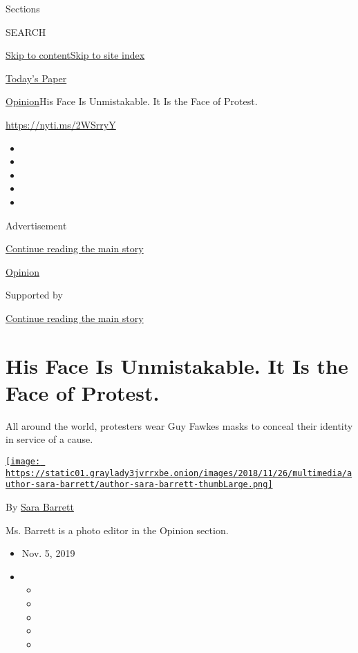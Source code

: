 Sections

SEARCH

\protect\hyperlink{site-content}{Skip to
content}\protect\hyperlink{site-index}{Skip to site index}

\href{https://myaccount.nytimes3xbfgragh.onion/auth/login?response_type=cookie\&client_id=vi}{}

\href{https://www.nytimes3xbfgragh.onion/section/todayspaper}{Today's
Paper}

\href{/section/opinion}{Opinion}\textbar{}His Face Is Unmistakable. It
Is the Face of Protest.

\url{https://nyti.ms/2WSrryY}

\begin{itemize}
\item
\item
\item
\item
\item
\end{itemize}

Advertisement

\protect\hyperlink{after-top}{Continue reading the main story}

\href{/section/opinion}{Opinion}

Supported by

\protect\hyperlink{after-sponsor}{Continue reading the main story}

\hypertarget{his-face-is-unmistakable-it-is-the-face-of-protest}{%
\section{His Face Is Unmistakable. It Is the Face of
Protest.}\label{his-face-is-unmistakable-it-is-the-face-of-protest}}

All around the world, protesters wear Guy Fawkes masks to conceal their
identity in service of a cause.

\href{https://www.nytimes3xbfgragh.onion/by/sara-barrett}{\texttt{[image: https://static01.graylady3jvrrxbe.onion/images/2018/11/26/multimedia/author-sara-barrett/author-sara-barrett-thumbLarge.png]}}

By \href{https://www.nytimes3xbfgragh.onion/by/sara-barrett}{Sara
Barrett}

Ms. Barrett is a photo editor in the Opinion section.

\begin{itemize}
\item
  Nov. 5, 2019
\item
  \begin{itemize}
  \item
  \item
  \item
  \item
  \item
  \end{itemize}
\end{itemize}

